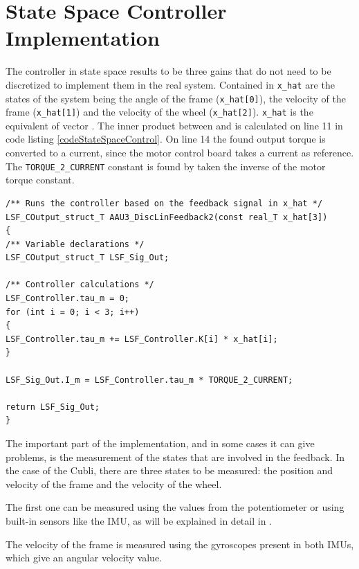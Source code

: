 \section{State Space Controller Implementation}\label{sec:SSImplementation}
The controller in state space results to be three gains that do not need to be discretized to implement them in the real system. 
Contained in \lstinline{x_hat} are the states of the system being the angle of the frame (\lstinline{x_hat[0]}), the velocity of the frame (\lstinline{x_hat[1]}) and the velocity of the wheel (\lstinline{x_hat[2]}). \lstinline{x_hat} is the equivalent of vector \si{}. The inner product between \si{} and \si{} is calculated on line 11 in code listing \ref{codeStateSpaceControl}. On line 14 the found output torque is converted to a current, since the motor control board takes a current as reference. The \lstinline{TORQUE_2_CURRENT} constant is found by taken the inverse of the motor torque constant.
\begin{lstlisting}[caption  = {Code for the implementation of the State Space Controller. The feedback from the cubli is contained in the array x\_hat.},
label    = codeStateSpaceControl ]
/** Runs the controller based on the feedback signal in x_hat */
LSF_COutput_struct_T AAU3_DiscLinFeedback2(const real_T x_hat[3])
{
/** Variable declarations */
LSF_COutput_struct_T LSF_Sig_Out;

/** Controller calculations */
LSF_Controller.tau_m = 0;
for (int i = 0; i < 3; i++)
{
LSF_Controller.tau_m += LSF_Controller.K[i] * x_hat[i];
}

LSF_Sig_Out.I_m = LSF_Controller.tau_m * TORQUE_2_CURRENT;

return LSF_Sig_Out;
}
\end{lstlisting}
The important part of the implementation, and in some cases it can give problems, is the measurement of the states that are involved in the feedback.
In the case of the Cubli, there are three states to be measured: the position and velocity of the frame and the velocity of the wheel.

The first one can be measured using the values from the potentiometer or using built-in sensors like the IMU, as will be explained in detail in .

The velocity of the frame is measured using the gyroscopes present in both IMUs, which give an angular velocity value.

